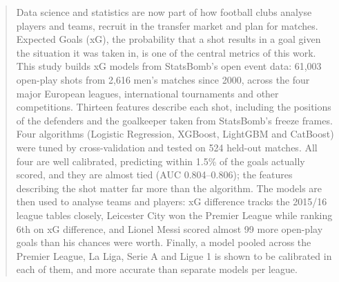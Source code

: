 \documentclass[12pt, a4paper]{report}
\begin{document}

\titleformat{\chapter}[display]   
{\normalfont\huge\bfseries}{\chaptertitlename\ \thechapter}{20pt}{\Huge}   
\titlespacing*{\chapter}{0pt}{-55pt}{40pt}
\titleformat{\chapter}[display]
{\normalfont\bfseries}{}{0pt}{\Huge}

\tableofcontents
\listoffigures
\listoftables

\printnomenclature



\begin{abstract}
Data science and statistics are now part of how football clubs analyse players and teams, recruit in the transfer market and plan for matches. Expected Goals (xG), the probability that a shot results in a goal given the situation it was taken in, is one of the central metrics of this work. This study builds xG models from StatsBomb's open event data: 61,003 open-play shots from 2,616 men's matches since 2000, across the four major European leagues, international tournaments and other competitions. Thirteen features describe each shot, including the positions of the defenders and the goalkeeper taken from StatsBomb's freeze frames. Four algorithms (Logistic Regression, XGBoost, LightGBM and CatBoost) were tuned by cross-validation and tested on 524 held-out matches. All four are well calibrated, predicting within 1.5\% of the goals actually scored, and they are almost tied (AUC 0.804--0.806); the features describing the shot matter far more than the algorithm. The models are then used to analyse teams and players: xG difference tracks the 2015/16 league tables closely, Leicester City won the Premier League while ranking 6th on xG difference, and Lionel Messi scored almost 99 more open-play goals than his chances were worth. Finally, a model pooled across the Premier League, La Liga, Serie A and Ligue 1 is shown to be calibrated in each of them, and more accurate than separate models per league.
\end{abstract}
\end{document}
